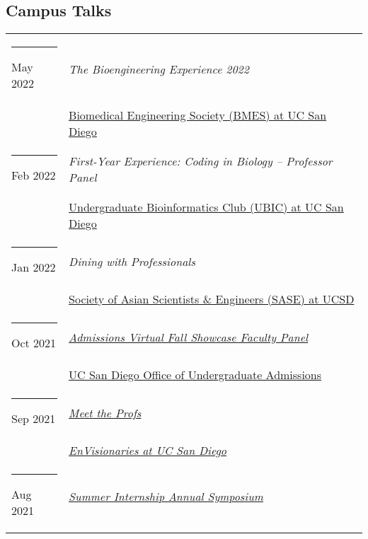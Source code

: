 \documentclass[margin,line]{res}
\begin{document}
\begin{resume}
\section{\sc Campus Talks}
\begin{longtable}{@{}p{0.7in}p{4in}}\rule{-1mm}{4.5mm}
\hspace*{-4mm} May 2022 & \textit{The Bioengineering Experience 2022}\\*
\hspace*{-4mm} & \hspace{4mm} \href{http://bmes.ucsd.edu/}{Biomedical Engineering Society (BMES) at UC San Diego}\\
\hspace*{-4mm} \rule{-1mm}{5mm} Feb 2022 & \textit{First-Year Experience: Coding in Biology -- Professor Panel}\\*
\hspace*{-4mm} & \hspace{4mm} \href{https://ubicucsd.github.io/}{Undergraduate Bioinformatics Club (UBIC) at UC San Diego}\\
\hspace*{-4mm} \rule{-1mm}{5mm} Jan 2022 & \textit{Dining with Professionals}\\*
\hspace*{-4mm} & \hspace{4mm} \href{https://saseatucsd.weebly.com/}{Society of Asian Scientists \& Engineers (SASE) at UCSD}\\
\hspace*{-4mm} \rule{-1mm}{5mm} Oct 2021 & \href{https://beatriton.ucsd.edu/register/ucsdvirtualfallshowcase}{\textit{Admissions Virtual Fall Showcase Faculty Panel}}\\*
\hspace*{-4mm} & \hspace{4mm} \href{https://admissions.ucsd.edu/}{UC San Diego Office of Undergraduate Admissions}\\
\hspace*{-4mm} \rule{-1mm}{5mm} Sep 2021 & \href{https://www.facebook.com/events/610194613335437}{\textit{Meet the Profs}}\\*
\hspace*{-4mm} & \hspace{4mm} \href{https://www.facebook.com/envisionariesUCSD/}{\textit{EnVisionaries at UC San Diego}}\\
\hspace*{-4mm} \rule{-1mm}{5mm} Aug 2021 & \href{https://dbmi.ucsd.edu/education/internships/index.html}{\textit{Summer Internship Annual Symposium}}\\*

\end{longtable}
\end{resume}
\end{document}
